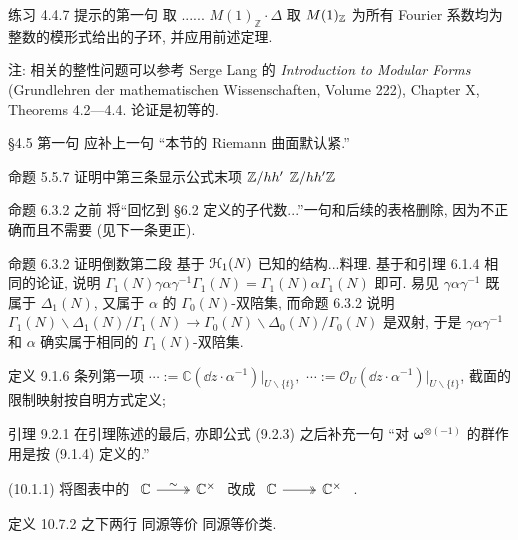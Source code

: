 \documentclass{AJerrata}
\begin{document}
\begin{Errata}
		\item[练习 4.4.7 提示的第一句]
		\Orig 取 ...... $M(1)_{\mathbb{Z}} \cdot \Delta$
		\Corr 取 $M(1)_{\mathbb{Z}}$ 为所有 Fourier 系数均为整数的模形式给出的子环, 并应用前述定理.
		
		注: 相关的整性问题可以参考 Serge Lang 的 \textit{Introduction to Modular Forms} (Grundlehren der mathematischen Wissenschaften, Volume 222), Chapter X, Theorems 4.2---4.4. 论证是初等的.
		
		\item[\S 4.5 第一句]
		应补上一句 ``本节的 Riemann 曲面默认紧.''
		
		\item[命题 5.5.7 证明中第三条显示公式末项]
		\Orig $\mathbb{Z}/hh'$
		\Corr $\mathbb{Z}/hh' \mathbb{Z}$

		\item[命题 6.3.2 之前]
		将``回忆到 \S 6.2 定义的子代数...''一句和后续的表格删除, 因为不正确而且不需要 (见下一条更正).
		
		\item[命题 6.3.2 证明倒数第二段]
		\Orig 基于 $\EuScript{H}_1(N)$ 已知的结构...料理.
		\Corr 基于和引理 6.1.4 相同的论证, 说明 $\Gamma_1(N) \gamma\alpha\gamma^{-1} \Gamma_1(N) = \Gamma_1(N)\alpha\Gamma_1(N)$ 即可. 易见 $\gamma\alpha\gamma^{-1}$ 既属于 $\Delta_1(N)$, 又属于 $\alpha$ 的 $\Gamma_0(N)$-双陪集, 而命题 6.3.2 说明 \linebreak $\Gamma_1(N) \backslash \Delta_1(N) / \Gamma_1(N) \to \Gamma_0(N) \backslash \Delta_0(N) / \Gamma_0(N)$ 是双射, 于是 $\gamma\alpha\gamma^{-1}$ 和 $\alpha$ 确实属于相同的 $\Gamma_1(N)$-双陪集.
		
		\item[定义 9.1.6 条列第一项]
		\Orig $\cdots := \mathbb{C} (\dd z \cdot \alpha^{-1}) |_{U \smallsetminus \{t\}},$
		\Corr $\cdots := \mathcal{O}_U (\dd z \cdot \alpha^{-1}) |_{U \smallsetminus \{t\}}$, 截面的限制映射按自明方式定义;
		
		
		\item[引理 9.2.1]
		在引理陈述的最后, 亦即公式 (9.2.3) 之后补充一句 ``对 $\symbf{\omega}^{\otimes (-1)}$ 的群作用是按 (9.1.4) 定义的.''
		
		\item[(10.1.1)] 将图表中的
		$\begin{tikzcd} \mathbb{C} \arrow[twoheadrightarrow, r, "\sim"] & \mathbb{C}^\times \end{tikzcd}$
		改成
		$\begin{tikzcd} \mathbb{C} \arrow[twoheadrightarrow, r] & \mathbb{C}^\times \end{tikzcd}$ .
		
		\item[定义 10.7.2 之下两行]
		\Orig 同源等价
		\Corr 同源等价类.
	\end{Errata}
\end{document}
